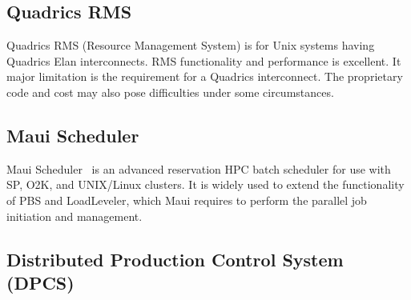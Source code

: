 %
%


\subsection{Quadrics RMS}

Quadrics RMS\cite{Quadrics02}
(Resource Management System) is for
Unix systems having Quadrics Elan interconnects.
RMS functionality and performance is excellent.
It major limitation is the requirement for a Quadrics interconnect.
The proprietary code and cost may also pose difficulties under some
circumstances.


\subsection*{Maui Scheduler}

Maui Scheduler~\cite{Maui} is an advanced reservation HPC batch scheduler
for use with SP, O2K, and UNIX/Linux clusters.
It is widely used to extend the functionality of PBS and LoadLeveler,
which Maui requires to perform the parallel job initiation and management.

\subsection*{Distributed Production Control System (DPCS)}

